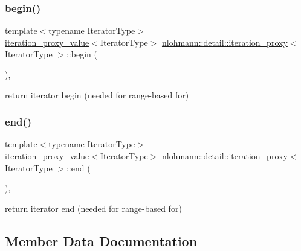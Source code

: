 \subsubsection{\texorpdfstring{begin()}{begin()}}
{\footnotesize\ttfamily template$<$typename Iterator\+Type$>$ \\
\hyperlink{classnlohmann_1_1detail_1_1iteration__proxy__value}{iteration\+\_\+proxy\+\_\+value}$<$Iterator\+Type$>$ \hyperlink{classnlohmann_1_1detail_1_1iteration__proxy}{nlohmann\+::detail\+::iteration\+\_\+proxy}$<$ Iterator\+Type $>$\+::begin (\begin{DoxyParamCaption}{ }\end{DoxyParamCaption})\hspace{0.3cm}{\ttfamily [inline]}, {\ttfamily [noexcept]}}



return iterator begin (needed for range-\/based for) 

\mbox{\label{classnlohmann_1_1detail_1_1iteration__proxy_a90091f8492d23576edef72c5e8b9d4cf}} 
\subsubsection{\texorpdfstring{end()}{end()}}
{\footnotesize\ttfamily template$<$typename Iterator\+Type$>$ \\
\hyperlink{classnlohmann_1_1detail_1_1iteration__proxy__value}{iteration\+\_\+proxy\+\_\+value}$<$Iterator\+Type$>$ \hyperlink{classnlohmann_1_1detail_1_1iteration__proxy}{nlohmann\+::detail\+::iteration\+\_\+proxy}$<$ Iterator\+Type $>$\+::end (\begin{DoxyParamCaption}{ }\end{DoxyParamCaption})\hspace{0.3cm}{\ttfamily [inline]}, {\ttfamily [noexcept]}}



return iterator end (needed for range-\/based for) 



\subsection{Member Data Documentation}
\mbox{\label{classnlohmann_1_1detail_1_1iteration__proxy_a88c0532ba4a5de1d527b18053b24fd19}} 
